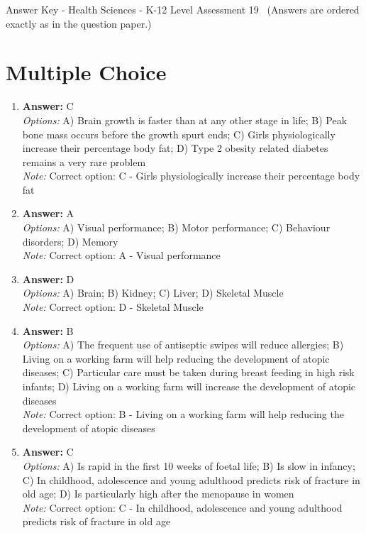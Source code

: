 \documentclass[12pt]{article}
\begin{document}
\begin{center}
Answer Key - Health Sciences - K-12 Level Assessment 19 \
\small (Answers are ordered exactly as in the question paper.)
\end{center}

\section*{Multiple Choice}
\begin{enumerate}[label=\arabic*.]
\item \textbf{Answer:} C
\\ \textit{Options:} A) Brain growth is faster than at any other stage in life; B) Peak bone mass occurs before the growth spurt ends; C) Girls physiologically increase their percentage body fat; D) Type 2 obesity related diabetes remains a very rare problem
\\ \textit{Note:} Correct option: C - Girls physiologically increase their percentage body fat
\item \textbf{Answer:} A
\\ \textit{Options:} A) Visual performance; B) Motor performance; C) Behaviour disorders; D) Memory
\\ \textit{Note:} Correct option: A - Visual performance
\item \textbf{Answer:} D
\\ \textit{Options:} A) Brain; B) Kidney; C) Liver; D) Skeletal Muscle
\\ \textit{Note:} Correct option: D - Skeletal Muscle
\item \textbf{Answer:} B
\\ \textit{Options:} A) The frequent use of antiseptic swipes will reduce allergies; B) Living on a working farm will help reducing the development of atopic diseases; C) Particular care must be taken during breast feeding in high risk infants; D) Living on a working farm will increase the development of atopic diseases
\\ \textit{Note:} Correct option: B - Living on a working farm will help reducing the development of atopic diseases
\item \textbf{Answer:} C
\\ \textit{Options:} A) Is rapid in the first 10 weeks of foetal life; B) Is slow in infancy; C) In childhood, adolescence and young adulthood predicts risk of fracture in old age; D) Is particularly high after the menopause in women
\\ \textit{Note:} Correct option: C - In childhood, adolescence and young adulthood predicts risk of fracture in old age
\end{enumerate}
\end{document}
